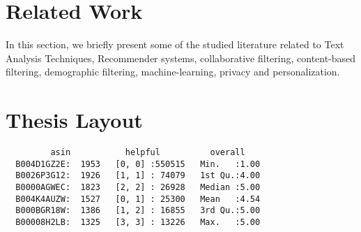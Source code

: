 \section{Related Work}
In this section, we briefly present some of the studied literature related to Text Analysis Techniques, Recommender systems, collaborative filtering, content-based filtering, demographic filtering, machine-learning, privacy and personalization.

\section{Thesis Layout}

\begin{verbatim}
         asin           helpful          overall    
  B004D1GZ2E:  1953   [0, 0] :550515   Min.   :1.00  
  B0026P3G12:  1926   [1, 1] : 74079   1st Qu.:4.00  
  B0000AGWEC:  1823   [2, 2] : 26928   Median :5.00  
  B004K4AUZW:  1527   [0, 1] : 25300   Mean   :4.54  
  B000BGR18W:  1386   [1, 2] : 16855   3rd Qu.:5.00  
  B00008H2LB:  1325   [3, 3] : 13226   Max.   :5.00  
\end{verbatim}


